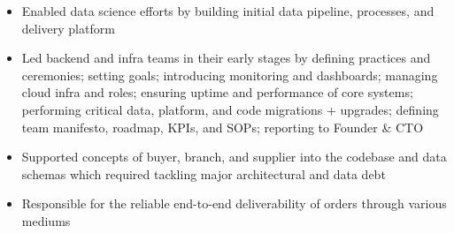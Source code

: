 \documentclass[paper=a4,fontsize=11pt]{scrartcl} %
\begin{document}
{\begin{itemize}
    \item Enabled data science efforts by building initial data pipeline, processes, and delivery platform
    \item Led backend and infra teams in their early stages by defining practices and ceremonies;
          setting goals; introducing monitoring and dashboards; managing cloud infra and roles;
          ensuring uptime and performance of core systems;
          performing critical data, platform, and code migrations + upgrades;
          defining team manifesto, roadmap, KPIs, and SOPs; reporting to Founder \& CTO
    \item Supported concepts of buyer, branch, and supplier into the codebase and data schemas
          which required tackling major architectural and data debt
    \item Responsible for the reliable end-to-end deliverability of orders through various mediums

\end{itemize}}
\end{document}
